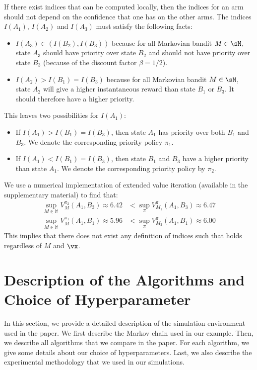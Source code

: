 \begin{subappendices}
If there exist indices that can be computed locally, then the indices for an arm should not depend on the confidence that one has on the other arms. The indices $I(A_1)$, $I(A_2)$ and $I(A_3)$ must satisfy the following facts: 
\begin{itemize}
    \item $I(A_3)\in(I(B_2),I(B_3))$ because for all Markovian bandit $M\in\sM$, state $A_3$ should have priority over state $B_2$ and should not have priority over state $B_3$ (because of the discount factor $\beta=1/2$).
    \item $I(A_2)>I(B_1)=I(B_3)$ because for all Markovian bandit $M\in\sM$, state $A_2$ will give a higher instantaneous reward than state $B_1$ or $B_3$. It should therefore have a higher priority.
\end{itemize}
This leaves two possibilities for $I(A_1)$: 
\begin{itemize}
\item If $I(A_1)>I(B_1)=I(B_3)$, then state $A_1$ has priority over both $B_1$ and $B_3$.  We denote the corresponding priority policy $\pi_1$.
\item If $I(A_1)<I(B_1)=I(B_3)$, then state $B_1$ and $B_3$ have a higher priority than state $A_1$. We denote the corresponding priority policy by $\pi_2$.
\end{itemize}  

We use a numerical implementation of extended value iteration (available in the supplementary material) to find that:
\begin{align}
    \sup_{M\in\mathbb{M}} V^{\pi_2}_{M}(A_1,B_3) \approx 6.42
    &< \sup_{\pi}V^{\pi}_{M_1}(A_1,B_3) \approx 6.47 \label{eq:counter-example1}\\
    \sup_{M\in\mathbb{M}} V^{\pi_1}_{M}(A_1,B_1) \approx 5.96
    &< \sup_{\pi}V^{\pi}_{M_2}(A_1,B_1) \approx 6.00 \nonumber
\end{align}
This implies that there does not exist any definition of indices such that  holds regardless of $M$ and $\vx$. 

\section{Description of the Algorithms and Choice of Hyperparameter}
\label{apx:algos}

In this section, we provide a detailed description of the simulation environment used in the paper. We first describe the Markov chain used in our example. Then, we describe all algorithms that we compare in the paper. For each algorithm, we give some details about our choice of hyperparameters. Last, we also describe the experimental methodology that we used in our simulations. 


\end{subappendices}
